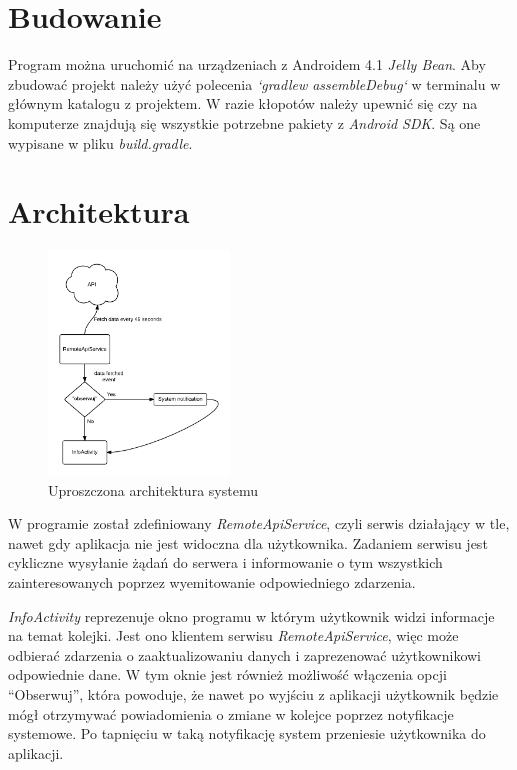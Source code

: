 \documentclass[12pt]{article}
\begin{document}
\maketitle

\section{Budowanie}
Program można uruchomić na urządzeniach z Androidem 4.1 \textit{Jelly Bean}.
Aby zbudować projekt należy użyć polecenia \textit{`gradlew assembleDebug`} w terminalu w głównym katalogu z projektem. W razie kłopotów należy upewnić się czy na komputerze znajdują się wszystkie potrzebne pakiety z \textit{Android SDK}. Są one wypisane w pliku \textit{build.gradle}.

\section{Architektura}
\begin{figure}[h]
\centerline{\includegraphics[width=0.43\textwidth]{arch}}
\caption{Uproszczona architektura systemu}
\label{fig:archas}
\end{figure}

W programie został zdefiniowany \textit{RemoteApiService}, czyli serwis działający w tle, nawet gdy aplikacja nie jest widoczna dla użytkownika. Zadaniem serwisu jest cykliczne wysyłanie żądań do serwera i informowanie o tym wszystkich zainteresowanych poprzez wyemitowanie odpowiedniego zdarzenia. 

\textit{InfoActivity} reprezenuje okno programu w którym użytkownik widzi informacje na temat kolejki. Jest ono klientem serwisu \textit{RemoteApiService}, więc może odbierać zdarzenia o zaaktualizowaniu danych i zaprezenować użytkownikowi odpowiednie dane. W tym oknie jest również możliwość włączenia opcji ``Obserwuj'', która powoduje, że nawet po wyjściu z aplikacji użytkownik będzie mógł otrzymywać powiadomienia o zmiane w kolejce poprzez notyfikacje systemowe. Po tapnięciu w taką notyfikację system przeniesie użytkownika do aplikacji.
\end{document}
